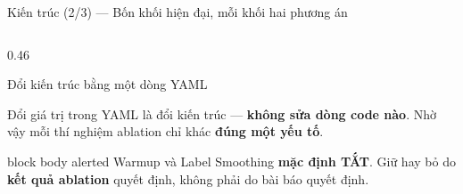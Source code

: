 \documentclass[aspectratio=169, 10pt]{beamer}
\begin{document}
\begin{frame}[shrink=10]{Kiến trúc (2/3) — Bốn khối hiện đại, mỗi khối hai phương án}
\begin{columns}[T]
\begin{column}{0.46\textwidth}
\begin{block}{Đổi kiến trúc bằng một dòng YAML}
\begin{itemize}
        \end{itemize}
        \vspace{0.2em}
        Đổi giá trị trong YAML là đổi kiến trúc — \textbf{không sửa dòng code nào}.
        Nhờ vậy mỗi thí nghiệm ablation chỉ khác \textbf{đúng một yếu tố}.
      \end{block}
      \begin{beamercolorbox}[wd=\textwidth, rounded=true, sep=6pt]{block body alerted}
        {\color{MLIOTink}\footnotesize Warmup và Label Smoothing \textbf{mặc định
        TẮT}. Giữ hay bỏ do \textbf{kết quả ablation} quyết định, không phải do bài
        báo quyết định.}
      \end{beamercolorbox}
    \end{column}
  \end{columns}
\end{frame}
\end{document}
